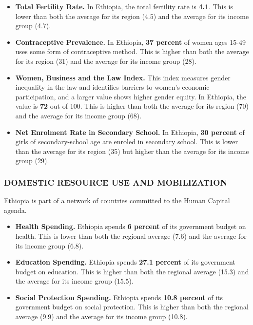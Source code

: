 \documentclass[9.2pt,twocolumn]{article}
\begin{document}
\begin{itemize}
\item
  \textbf{Total Fertility Rate.} In Ethiopia, the total fertility rate
  is \textbf{4.1}. This is lower than both the average for its region
  (4.5) and the average for its income group (4.7).
\item
  \textbf{Contraceptive Prevalence.} In Ethiopia, \textbf{37 percent} of
  women ages 15-49 uses some form of contraceptive method. This is
  higher than both the average for its region (31) and the average for
  its income group (28).
\item
  \textbf{Women, Business and the Law Index.} This index measures gender
  inequality in the law and identifies barriers to women's economic
  participation, and a larger value shows higher gender equity. In
  Ethiopia, the value is \textbf{72} out of 100. This is higher than
  both the average for its region (70) and the average for its income
  group (68).
\item
  \textbf{Net Enrolment Rate in Secondary School.} In Ethiopia,
  \textbf{30 percent} of girls of secondary-school age are enroled in
  secondary school. This is lower than the average for its region (35)
  but higher than the average for its income group (29).
\end{itemize}

\hypertarget{section-2}{%
\subsubsection{\texorpdfstring{\textcolor{bondiblue}{\textbf{D\small{OMESTIC RESOURCE USE AND MOBILIZATION}}}}{}}\label{section-2}}

Ethiopia is part of a network of countries committed to the Human
Capital agenda.

\begin{itemize}
\item
  \textbf{Health Spending.} Ethiopia spends \textbf{6 percent} of its
  government budget on health. This is lower than both the regional
  average (7.6) and the average for its income group (6.8).
\item
  \textbf{Education Spending.} Ethiopia spends \textbf{27.1 percent} of
  its government budget on education. This is higher than both the
  regional average (15.3) and the average for its income group (15.5).
\item
  \textbf{Social Protection Spending.} Ethiopia spends \textbf{10.8
  percent} of its government budget on social protection. This is higher
  than both the regional average (9.9) and the average for its income
  group (10.8).
\end{itemize}
\end{document}
